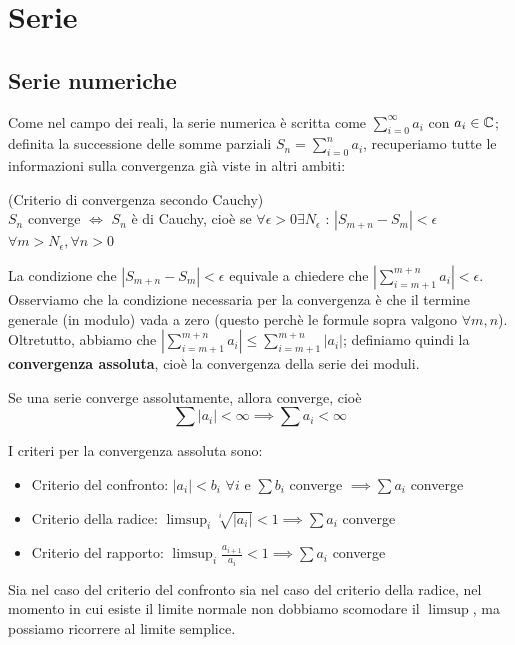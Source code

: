 \chapter{Serie}

\section{Serie numeriche}

Come nel campo dei reali, la serie numerica è scritta come $\sum_{i=0} ^{\infty} a_i$ con $a_i \in \mathbb{C}$; definita la successione delle somme parziali $S_n=\sum_{i=0} ^n a_i$, recuperiamo tutte le informazioni sulla convergenza già viste in altri ambiti:
\begin{teorema} (Criterio di convergenza secondo Cauchy)\\$S_n$ converge $\iff$ $S_n$ è di Cauchy, cioè se $\forall \epsilon >0 \exists N_{\epsilon}$ : $|S_{m+n} - S_m| < \epsilon$ $\forall m>N_{\epsilon}, \forall n>0$
\end{teorema}
La condizione che $|S_{m+n} - S_m| < \epsilon$ equivale a chiedere che $\left|\sum_{i=m+1} ^{m+n} a_i \right| < \epsilon$. \\Osserviamo che la condizione necessaria per la convergenza è che il termine generale (in modulo) vada a zero (questo perchè le formule sopra valgono $\forall m,n$). Oltretutto, abbiamo che $\left|\sum_{i=m+1} ^{m+n} a_i \right| \leq \sum_{i=m+1} ^{m+n} |a_i|$; definiamo quindi la \textbf{convergenza assoluta}, cioè la convergenza della serie dei moduli.
\begin{teorema}
Se una serie converge assolutamente, allora converge, cioè 
$$\sum |a_i|<\infty \implies \sum a_i<\infty$$
\end{teorema}
I criteri per la convergenza assoluta sono:
\begin{itemize}
\item Criterio del confronto:	$|a_i|<b_i$ $\forall i$ e $\sum b_i$ converge $\implies \sum a_i$ converge
\item Criterio della radice:		$\limsup_i \sqrt[i] {|a_i|} <1 \implies \sum a_i$ converge
\item Criterio del rapporto:		$\limsup_i \frac{a_{i+1}}{a_i}<1 \implies \sum a_i$ converge
\end{itemize}
Sia nel caso del criterio del confronto sia nel caso del criterio della radice, nel momento in cui esiste il limite normale non dobbiamo scomodare il $\limsup$, ma possiamo ricorrere al limite semplice.

